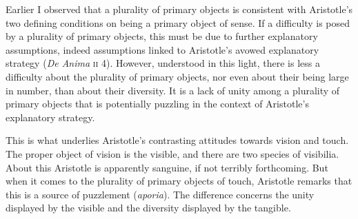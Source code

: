 Earlier I observed that a plurality of primary objects is consistent with Aristotle's two defining conditions on being a primary object of sense. If a difficulty is posed by a plurality of primary objects, this must be due to further explanatory assumptions, indeed assumptions linked to Aristotle's avowed explanatory strategy (\emph{De Anima} \textsc{ii} 4). However, understood in this light, there is less a difficulty about the plurality of primary objects, nor even about their being large in number, than about their diversity. It is a lack of unity among a plurality of primary objects that is potentially puzzling in the context of Aristotle's explanatory strategy. 

This is what underlies Aristotle's contrasting attitudes towards vision and touch. The proper object of vision is the visible, and there are two species of visibilia. About this Aristotle is apparently sanguine, if not terribly forthcoming. But when it comes to the plurality of primary objects of touch, Aristotle remarks that this is a source of puzzlement (\emph{aporia}). The difference concerns the unity displayed by the visible and the diversity displayed by the tangible.

